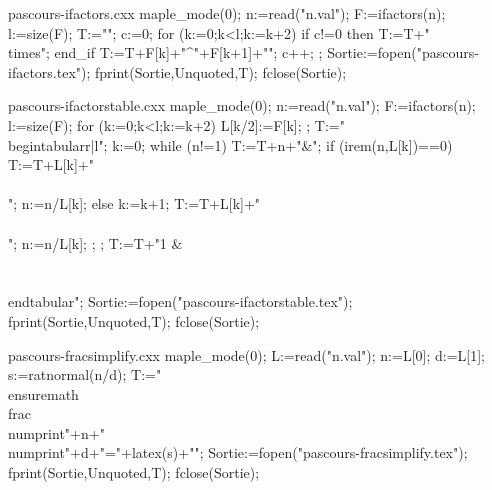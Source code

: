 
\begin{VerbatimOut}{pascours-ifactors.cxx}
maple_mode(0);
n:=read("n.val");
F:=ifactors(n);
l:=size(F);
T:="";
c:=0;
for (k:=0;k<l;k:=k+2) { if c!=0 then T:=T+"\\times"; end_if T:=T+F[k]+"^{"+F[k+1]+"}"; c++; };
Sortie:=fopen("pascours-ifactors.tex");
fprint(Sortie,Unquoted,T);
fclose(Sortie);
\end{VerbatimOut}
  
\newenvironment*{ifactors}
{\VerbatimEnvironment\begin{VerbatimOut}{n.val}}
{\end{VerbatimOut}
\immediate\write18{giac <pascours-ifactors.cxx}
\ensuremath{}
}


\begin{VerbatimOut}{pascours-ifactorstable.cxx}
maple_mode(0);
n:=read("n.val");
F:=ifactors(n);
l:=size(F);
for (k:=0;k<l;k:=k+2){ L[k/2]:=F[k]; }; 
T:="\\begin{tabular}{r|l}";
k:=0;
while (n!=1) { T:=T+n+"&"; if (irem(n,L[k])==0) { T:=T+L[k]+"\\\\"; n:=n/L[k]; } else { k:=k+1; T:=T+L[k]+"\\\\"; n:=n/L[k]; };  };
T:=T+"1 & \\\\\\end{tabular}";
Sortie:=fopen("pascours-ifactorstable.tex");
fprint(Sortie,Unquoted,T);
fclose(Sortie);
\end{VerbatimOut}
  
\newenvironment*{ifactorstable}
{\VerbatimEnvironment\begin{VerbatimOut}{n.val}}
{\end{VerbatimOut}
\immediate\write18{giac <pascours-ifactorstable.cxx}

}


\begin{VerbatimOut}{pascours-fracsimplify.cxx}
maple_mode(0);
L:=read("n.val");
n:=L[0];
d:=L[1];
s:=ratnormal(n/d);
T:="\\ensuremath{\\frac{\\numprint{"+n+"}}{\\numprint{"+d+"}}="+latex(s)+"}";
Sortie:=fopen("pascours-fracsimplify.tex");
fprint(Sortie,Unquoted,T);
fclose(Sortie);
\end{VerbatimOut}
  
